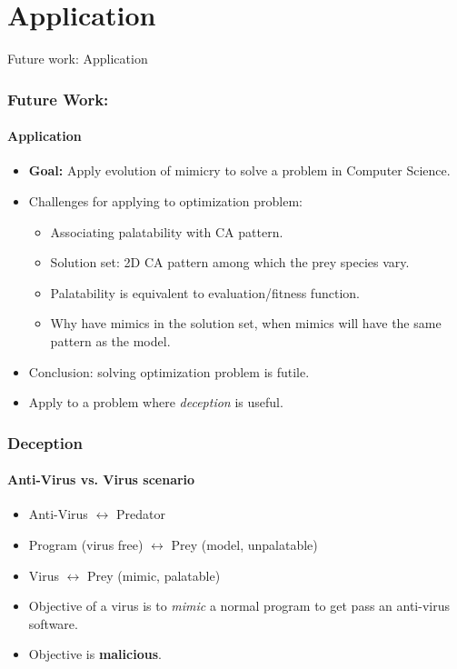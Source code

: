 \section{Application}

\frame
{
	\begin{center}
		\LARGE Future work: Application
	\end{center}
}

\frame
{
	\frametitle{Future Work:}
	\framesubtitle{Application}
	
	\begin{itemize}
		\item \textbf{Goal:} Apply evolution of mimicry to solve a problem in Computer Science.
		\item Challenges for applying to optimization problem:
			\begin{itemize}
				\item Associating palatability with CA pattern.
				\item Solution set: 2D CA pattern among which the prey species vary.
				\item Palatability is equivalent to evaluation/fitness function.
				\item Why have mimics in the solution set, when mimics will have the same pattern as the model.
			\end{itemize}
		\item Conclusion: solving optimization problem is futile.
		\item Apply to a problem where \textit{deception} is useful.
	\end{itemize}
}

\frame
{
	\frametitle{Deception}
	\framesubtitle{Anti-Virus vs. Virus scenario}

	\begin{itemize}
		\item Anti-Virus \(\leftrightarrow\) Predator
		\item Program (virus free) \(\leftrightarrow\) Prey (model, unpalatable)
		\item Virus \(\leftrightarrow\) Prey (mimic, palatable)
	\end{itemize}
	
	\begin{itemize}
		\item Objective of a virus is to \textit{mimic} a normal program to get pass an anti-virus software.
		\item Objective is \textbf{malicious}.
	\end{itemize}
}